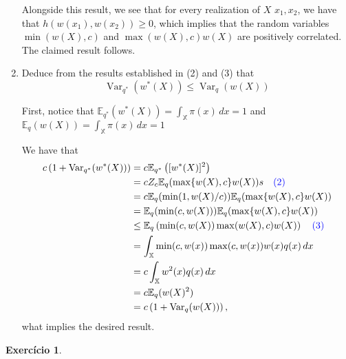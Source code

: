 \documentclass[a4paper,12pt]{article}
\newcommand{\var}{\operatorname{Var}}
\newcommand{\ev}{\mathbb{E}}
\newtheorem{exercise}{Exercício}
\theoremstyle{definition}
\begin{document}
\begin{enumerate}
    Alongside this result, we see that for every realization of $X$
    $x_1, x_2$, we have that $h(w(x_1), w(x_2)) \ge 0$, which implies 
    that the random variables $\min(w(X), c)$ and $\max(w(X), c)w(X)$
    are positively correlated. The claimed result follows. 

    \item Deduce from the results established in (2) and (3) that
    $$
    \var_{q^*}(w^*(X)) \le \var_q(w(X))
    $$

    First, notice that $\ev_{q^*}(w^*(X)) = \int_{\mathbb{X}} \pi(x) \, dx  =
    1$ and  $\ev_{q}(w(X)) = \int_{\mathbb{X}} \pi(x) \, dx  =
    1$

    We have that 
    \begin{equation*}
        \begin{split}
            c\left(1 + \var_{q^*}(w^*(X))\right) &=  c\ev_{q^*}\left([w^*(X)]^2\right) \\
            &= cZ_c\ev_q(\max\{{w(X), c}\}w(X)) s\textcolor{blue}{\quad(2)}\\
            &= c\ev_q(\min(1, w(X) / c))\ev_q(\max\{{w(X), c}\}w(X)) \\
            &= \ev_q(\min(c, w(X)))\ev_q(\max\{{w(X), c}\}w(X)) \\
            &\le \ev_q\left(\min(c,w(X)) \max(w(X), c) w(X)\right)  \textcolor{blue}{\quad(3)}\\
            &= \int_{\mathbb{X}} \min(c,w(x))\max(c,w(x))w(x)q(x) \, dx \\
            &= c\int_{\mathbb{X}} w^2(x) q(x) \, dx \\ 
            &= c\ev_q(w(X)^2) \\
            &= c\left(1 + \var_{q}(w(X))\right), 
        \end{split}
    \end{equation*}
    what implies the desired result. 


\end{enumerate}

\begin{exercise}
    
\end{exercise}

% 
% 
\end{document}
